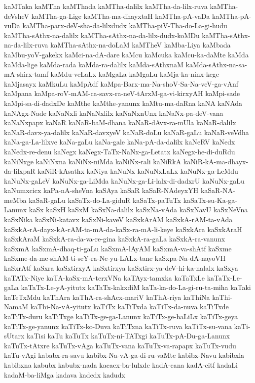 {kaMTaka
kaMTha
kaMThada
kaMTha-dalilx
kaMTha-da-lilx-ruva
kaMTha-deVsheV
kaMTha-ga-Lige
kaMTha-ma-dhayxtaH
kaMTha-pA-vaDa
kaMTha-pA-vuDa
kaMTha-parx-deV-sha-da-lilxdudx
kaMTha-piV-Tha-do-La-gi-hudu
kaMTha-sAthx-na-dalilx
kaMTha-sAthx-na-da-lilx-dudx-koMDu
kaMTha-sAthx-na-da-lilx-ruva
kaMTha-sAthx-na-doLaM
kaMTheV
kaMba-Liya
kaMbada
kaMbu-yoV-gakekx
kaMci-na-dA-dare
kaMcu
kaMcuka
kaMcu-ka-daMte
kaMda
kaMda-lige
kaMda-rada
kaMda-ra-dalilx
kaMda-sAthxnaM
kaMda-sAthx-na-sa-mA-shirx-tamf
kaMdu-veLaLx
kaMgaLa
kaMgaLu
kaMja-ka-ninx-kege
kaMjasayx
kaMkuLu
kaMpAdf
kaMpa-Barx-ma-Na-shoV-Sa-Na-veV-ga-vAnf
kaMpana
kaMpa-roV-mAM-ca-savx-ra-neV-tArxM-ga-vi-kirxyAH
kaMpi-sade
kaMpi-sa-di-dadxDe
kaMthe
kaMthe-yanunx
kaMtu-ma-daRna
kaNA
kaNAda
kaNAgx-Nade
kaNaNxli
kaNaNxlilx
kaNaNxnUnx
kaNaNx-pa-deV-vana
kaNaNxpapx
kaNaR
kaNaR-baM-dhana
kaNaR-dAvx-ra-mUla
kaNaR-dalilx
kaNaR-davx-ya-dalilx
kaNaR-davxyeV
kaNaR-doLu
kaNaR-gaLu
kaNaR-veVdha
kaNa-ga-La-lilxve
kaNa-gaLu
kaNa-gale
kaNa-pA-da-dalilx
kaNeRV
kaNedx
kaNedx-re-denu
kaNegx
kaNegx-TaTx-NaNx-ga-Letatx
kaNegx-he-di-duRdu
kaNiNxge
kaNiNxna
kaNiNx-niMda
kaNiNx-rali
kaNiRkA
kaNiR-kA-ma-dhayx-da-lilxpaR
kaNiR-kAsathx
kaNiya
kaNuNx
kaNuNxLaLx
kaNuNx-ga-LeMdu
kaNuNx-gaLeV
kaNuNx-ga-LiMda
kaNuNx-ga-Li-lalx-di-dadxrU
kaNuNx-gaLu
kaNumxcicx
kaPa-nA-sheVna
kaSAya
kaSaR
kaSaR-NAdeyxYH
kaSaR-NA-meMba
kaSaR-gaLu
kaSaTx-do-La-giduR
kaSaTx-paTuTx
kaSaTx-su-Ka-ga-Lanunx
kaSx
kaSxH
kaSxM
kaSxNa-dalilx
kaSxNa-vAda
kaSxNavU
kaSxNeVna
kaSxNika
kaSxNi-katavx
kaSxNi-kaveV
kaSxkArAM
kaSxkA-rAM-ta-vAda
kaSxkA-rA-dayx-kA-rAM-ta-mA-da-kaSx-ra-mA-li-keye
kaSxkAra
kaSxkAraH
kaSxkAraM
kaSxkA-ra-da-va-re-gina
kaSxkA-ra-gaLa
kaSxkA-ra-vanunx
kaSxmA
kaSxmA-dhaq-ti-gaLu
kaSxmA-lAyAM
kaSxmA-va-shAtf
kaSxme
kaSxme-da-me-shAM-ti-seY-ra-Ne-yu-LALx-tane
kaSxpa-Na-dA-nayoVH
kaSxrAtf
kaSxra
kaSxtirxyA
kaSxtirxya
kaSxtirx-ya-deV-hi-ka-nalalx
kaSxya
kaTATx-Niye
kaTA-kaSx-mA-terxVNa
kaTAyx-tamxka
kaTaTxLe
kaTaTx-Le-gaLa
kaTaTx-Le-yA-yitutx
kaTaTx-kakxdiM
kaTa-ka-do-La-gi-ru-ta-miha
kaTaki
kaTeTxMdu
kaThAra
kaThA-ra-shAcx-mariV
kaThA-riya
kaThiNa
kaThi-NamaM
kaThi-Na-vA-yitutx
kaTiTx
kaTiTxda
kaTiTx-da-nuva
kaTiTxde
kaTiTx-duru
kaTiTxge
kaTiTx-ge-ga-Lanunx
kaTiTx-ge-haLiLx
kaTiTx-geya
kaTiTx-ge-yanunx
kaTiTx-ko-Duva
kaTiTxna
kaTiTx-ruva
kaTiTx-su-vana
kaTi-sUtarx
kaTisi
kaTu
kaTuTx
kaTuTx-ni-TATxgi
kaTuTx-pA-Du-ga-Lanunx
kaTuTx-tAtxre
kaTuTx-vAga
kaTuTx-vana
kaTuTx-va-rapapx
kaTuTx-vudu
kaTu-vAgi
kababx-ra-savu
kabibx-Na-vA-ga-di-ru-vaMte
kabibx-Navu
kabibxla
kabibxna
kabubx
kabubx-nada
kacacx-ba-lulxde
kadA-cana
kadA-citf
kadaLi
kadaM-ba-liMga
kadava
kadedx
kadudx
}
